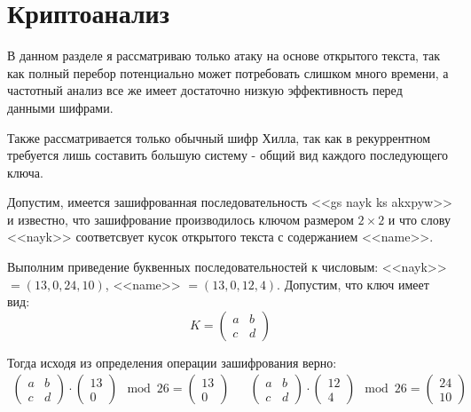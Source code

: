 \documentclass[a4paper]{article}
\begin{document}
  \newpage
  \section{Криптоанализ}

  В данном разделе я рассматриваю только атаку на основе открытого текста, так 
  как полный перебор потенциально может потребовать слишком много времени, а
  частотный анализ все же имеет достаточно низкую эффективность перед данными
  шифрами.

  Также рассматривается только обычный шифр Хилла, так как в рекуррентном требуется
  лишь составить большую систему - общий вид каждого последующего ключа.

  Допустим, имеется зашифрованная последовательность <<gs nayk ks akxpyw>> и известно,
  что зашифрование производилось ключом размером $2 \times 2$ и что слову <<nayk>> соответсвует
  кусок открытого текста с содержанием <<name>>.

  Выполним приведение буквенных последовательностей к числовым:
  <<nayk>> $ = (13, 0, 24, 10)$, <<name>> $= (13, 0, 12, 4)$. Допустим, что ключ имеет вид:
  \begin{equation}
    K = \begin{pmatrix}
        a & b \\ c & d
    \end{pmatrix}
  \end{equation}

  Тогда исходя из определения операции зашифрования верно:
  \begin{align}
    \begin{pmatrix}
        a & b \\ c & d
    \end{pmatrix} \cdot \begin{pmatrix}
        13 \\ 0
    \end{pmatrix} \mod{26} = \begin{pmatrix}
        13 \\ 0
    \end{pmatrix} &&
    \begin{pmatrix}
        a & b \\ c & d
    \end{pmatrix} \cdot \begin{pmatrix}
        12 \\ 4
    \end{pmatrix} \mod{26}= \begin{pmatrix}
        24 \\ 10
    \end{pmatrix}
  \end{align}
\end{document}
